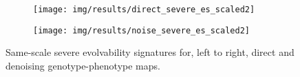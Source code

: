 \begin{figure}
        \begin{subfigure}[b]{0.5\textwidth}
                \texttt{[image: img/results/direct\_severe\_es\_scaled2]}
        \end{subfigure}%
        \begin{subfigure}[b]{0.5\textwidth}
                \texttt{[image: img/results/noise\_severe\_es\_scaled2]}
        \end{subfigure}
        \caption{
          Same-scale severe evolvability signatures for, left to right, direct and denoising genotype-phenotype maps.
          }\label{fig:noise_severe_compare_es}
\end{figure}

